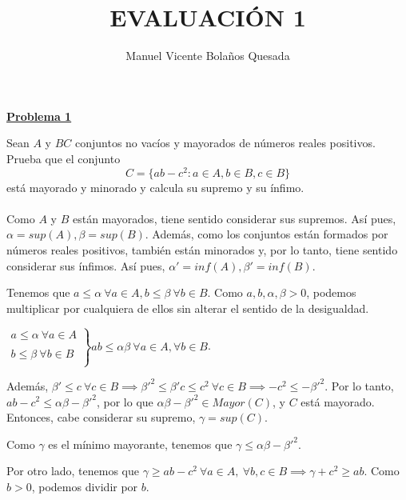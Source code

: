 \documentclass[10pt,a4paper]{article}
\begin{document}
	\title{EVALUACIÓN 1}
	\author{Manuel Vicente Bolaños Quesada}
	\date{}
	\maketitle
	\begin{flushleft}
		\textbf{\underline{Problema 1}}
	\end{flushleft}

	Sean $A$ y $BC$ conjuntos no vacíos y mayorados de números reales positivos. Prueba que el conjunto $$C = \{ab-c^2 : a \in A, b\in B, c\in B\}$$ está mayorado y minorado y calcula su supremo y su ínfimo. \\ \\
	
	Como $A$ y $B$ están mayorados, tiene sentido considerar sus supremos. Así pues, $\alpha = sup(A), \beta = sup(B)$. Además, como los conjuntos están formados por números reales positivos, también están minorados y, por lo tanto, tiene sentido considerar sus ínfimos. Así pues, $\alpha ' = inf(A), \beta '=inf(B)$. \newline
	
	Tenemos que $a \leq \alpha ~ \forall a \in A, b \leq \beta ~ \forall b \in B$. Como $a, b, \alpha, \beta > 0$, podemos multiplicar por cualquiera de ellos sin alterar el sentido de la desigualdad. \newline
	
	$\left.\begin{array}{lcc}
		a \leq \alpha ~ \forall a \in A\\
		\\ b \leq \beta ~ \forall b \in B \\
	\end{array}\right\rbrace ab \leq \alpha \beta ~ \forall a \in A, \forall b \in B$. \newline

	Además, $\beta ' \leq c ~ \forall c \in B \implies \beta'^2 \leq \beta ' c \leq c^2 ~ \forall c \in B \implies -c^2 \leq -\beta'^2$. Por lo tanto, $ab-c^2 \leq \alpha\beta-\beta'^2$, por lo que $\alpha\beta-\beta'^2 \in Mayor(C)$, y $C$ está mayorado. Entonces, cabe considerar su supremo, $\gamma = sup(C)$. \newline
	
	Como $\gamma$ es el mínimo mayorante, tenemos que $\gamma \leq \alpha\beta-\beta'^2$. \newline
	
	Por otro lado, tenemos que $\gamma \geq ab-c^2 ~ \forall a \in A, ~ \forall b, c \in B \implies \gamma + c^2 \geq ab$. Como $ b > 0$, podemos dividir por $b$. \newline
	
\end{document}
